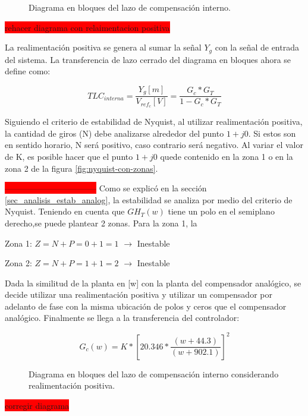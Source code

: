 \begin{figure}[H]
	\centering
	
	\caption{Diagrama en bloques del lazo de compensación interno.}	\label{fig:diag-interno_dig_realimentacion_positiva}
\end{figure}

\colorbox{red}{rehacer diagrama con relaimentacion positiva}

La realimentación positiva se genera al sumar la señal $Y_g$ con la señal de entrada del sistema. La transferencia de lazo cerrado del diagrama en bloques ahora se define como:

\begin{equation}
	TLC_{interna}=\frac{Y_g[m]}{V_{ref_c}[V]}=\frac{G_c*G_T}{1-G_c*G_T}
\end{equation}

Siguiendo el criterio de estabilidad de Nyquist, al utilizar realimentación positiva, la cantidad de giros (N) debe analizarse alrededor del punto $1+j0$. Si estos son en sentido horario, N será positivo, caso contrario será negativo. Al variar el valor de K, es posible hacer que el punto $1+j0$ quede contenido en la zona 1 o en la zona 2 de la figura \ref{fig:nyquist-con-zonas}. 



\colorbox{red}{---------------------------------}
Como se explicó en la sección \ref{sec_analisis_estab_analog}, la estabilidad se analiza por medio del criterio de Nyquist. Teniendo en cuenta que ${GH}_{T}(w)$ tiene un polo en el semiplano derecho,se puede plantear 2 zonas.
Para la zona 1, la 

 Zona 1: $Z=N+P=0+1=1$ $\mathrm{\to}$ Inestable 

 Zona 2: $Z=N+P=1+1=2$ $\mathrm{\to}$ Inestable
 
 Dada la similitud de la planta en [w] con la planta del compensador analógico, se decide utilizar una realimentación positiva y utilizar un compensador por adelanto de fase
 con la misma ubicación de polos y ceros que el compensador analógico. Finalmente se llega a la transferencia del controlador:
 

 \begin{equation}  
 	G_c(w)=K*{[20.346*\frac{(w+44.3)}{(w+902.1)}]}^2
 \end{equation} 
 
\begin{figure}[H]
	\centering
	
	\caption{Diagrama en bloques del lazo de compensación interno considerando realimentación positiva.}	\label{fig:diag-interno_realimentacion_positiva_dig}
\end{figure}
\colorbox{red}{corregir diagrama}

